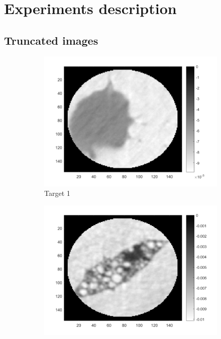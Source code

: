\section{Experiments description}
\subsection{Truncated images}
\begin{figure}[ht!]
        \centering	
		\begin{subfigure}[b]{0.30\textwidth}
            \centering
            \includegraphics[width=\textwidth]{../../data/res/target1.png}
            \caption{Target 1}
        \end{subfigure}
        \hfill
        \begin{subfigure}[b]{0.30\textwidth}
            \centering
            \includegraphics[width=\textwidth]{../../data/res/target2.png}

\end{subfigure}
\end{figure}
